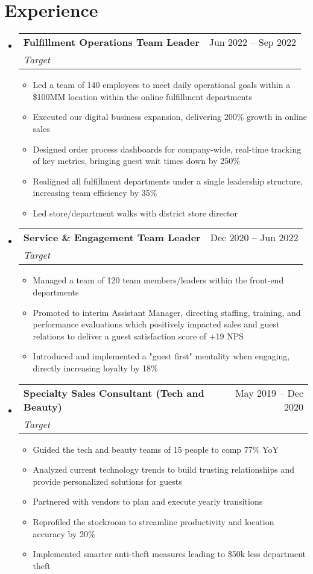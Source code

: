 \documentclass[letterpaper,11pt]{article}
\makeatletter
\newcommand{\resumeItem}[1]{
  \item\small{
    {#1 \vspace{-2pt}}
  }
}
\newcommand{\resumeSubheading}[4]{
  \vspace{-2pt}\item
    \begin{tabular*}{0.97\textwidth}[t]{l@{\extracolsep{\fill}}r}
      \textbf{#1} & #2 \\
      \textit{\small#3} & \textit{\small #4} \\
    \end{tabular*}\vspace{-7pt}
}
\newcommand{\resumeSubSubheading}[2]{
    \item
    \begin{tabular*}{0.97\textwidth}{l@{\extracolsep{\fill}}r}
      \textit{\small#1} & \textit{\small #2} \\
    \end{tabular*}\vspace{-7pt}
}
\newcommand{\resumeSubHeadingListStart}{\begin{itemize}[leftmargin=0.15in, label={}]}
\newcommand{\resumeSubHeadingListEnd}{\end{itemize}}
\newcommand{\resumeItemListStart}{\begin{itemize}}
\newcommand{\resumeItemListEnd}{\end{itemize}\vspace{-5pt}}
\makeatother
\begin{document}
\section{Experience}
  \resumeSubHeadingListStart
    \resumeSubheading
      {Fulfillment Operations Team Leader}{Jun 2022 -- Sep 2022}
      {Target}{}
      \resumeItemListStart
        \resumeItem{Led a team of 140 employees to meet daily operational goals within a \$100MM location within the online fulfillment departments}
        \resumeItem{Executed our digital business expansion, delivering 200\% growth in online sales}
        \resumeItem{Designed order process dashboards for company-wide, real-time tracking of key metrics, bringing guest wait times down by 250\%}
        \resumeItem{Realigned all fulfillment departments under a single leadership structure, increasing team efficiency by 35\%}
        \resumeItem{Led store/department walks with district store director}
      \resumeItemListEnd

    \resumeSubheading
      {Service \& Engagement Team Leader}{Dec 2020 -- Jun 2022}
      {Target}{}
      \resumeItemListStart
        \resumeItem{Managed a team of 120 team members/leaders within the front-end departments}
        \resumeItem{Promoted to interim Assistant Manager, directing staffing, training, and performance evaluations which positively impacted sales and guest relations to deliver a guest satisfaction score of +19 NPS}
        \resumeItem{Introduced and implemented a "guest first" mentality when engaging, directly increasing loyalty by 18\%}
      \resumeItemListEnd

    \resumeSubheading
      {Specialty Sales Consultant (Tech and Beauty)}{May 2019 -- Dec 2020}
      {Target}{}
      \resumeItemListStart
        \resumeItem{Guided the tech and beauty teams of 15 people to comp 77\% YoY}
        \resumeItem{Analyzed current technology trends to build trusting relationships and provide personalized solutions for guests}
        \resumeItem{Partnered with vendors to plan and execute yearly transitions}
        \resumeItem{Reprofiled the stockroom to streamline productivity and location accuracy by 20\%}
        \resumeItem{Implemented smarter anti-theft measures leading to \$50k less department theft}
      \resumeItemListEnd
      
  \resumeSubHeadingListEnd
\end{document}
